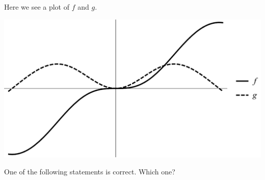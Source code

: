 \documentclass{ximera}
\author{Bart Snapp\and Nela Lakos}
\begin{document}
\begin{exercise}
Here we see a plot of $f$ and $g$. 
\begin{image}
\includegraphics[width=.5\textwidth]{graphFandG3.png}
\end{image}
One of the following statements is correct. Which one?
\begin{multipleChoice}
\end{multipleChoice}
\end{exercise}
\end{document}
